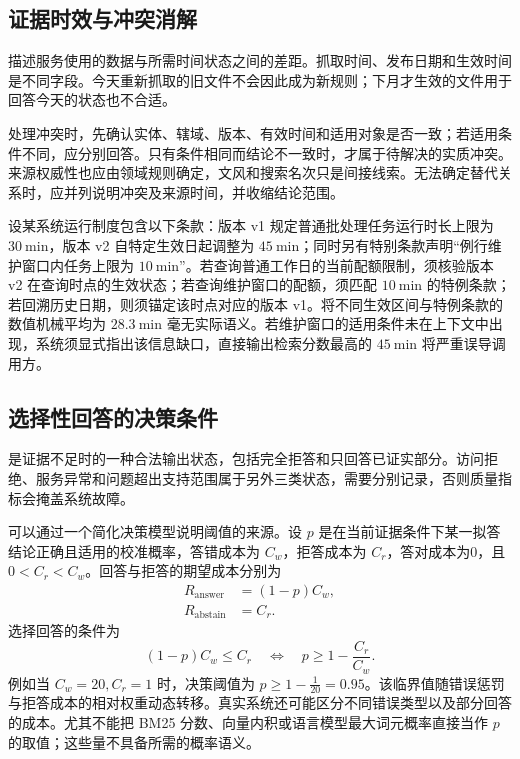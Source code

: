 \documentclass[../textbook.tex]{subfiles}
\begin{document}
\subsection{证据时效与冲突消解}
描述服务使用的数据与所需时间状态之间的差距。抓取时间、发布日期和生效时间是不同字段。今天重新抓取的旧文件不会因此成为新规则；下月才生效的文件用于回答今天的状态也不合适。

处理冲突时，先确认实体、辖域、版本、有效时间和适用对象是否一致；若适用条件不同，应分别回答。只有条件相同而结论不一致时，才属于待解决的实质冲突。来源权威性也应由领域规则确定，文风和搜索名次只是间接线索。无法确定替代关系时，应并列说明冲突及来源时间，并收缩结论范围。

设某系统运行制度包含以下条款：版本 v1 规定普通批处理任务运行时长上限为 $\qty{30}{\minute}$，版本 v2 自特定生效日起调整为 $\qty{45}{\minute}$；同时另有特别条款声明“例行维护窗口内任务上限为 $\qty{10}{\minute}$”。若查询普通工作日的当前配额限制，须核验版本 v2 在查询时点的生效状态；若查询维护窗口的配额，须匹配 $\qty{10}{\minute}$ 的特例条款；若回溯历史日期，则须锚定该时点对应的版本 v1。将不同生效区间与特例条款的数值机械平均为 $\qty{28.3}{\minute}$ 毫无实际语义。若维护窗口的适用条件未在上下文中出现，系统须显式指出该信息缺口，直接输出检索分数最高的 $\qty{45}{\minute}$ 将严重误导调用方。

\subsection{选择性回答的决策条件}
是证据不足时的一种合法输出状态，包括完全拒答和只回答已证实部分。访问拒绝、服务异常和问题超出支持范围属于另外三类状态，需要分别记录，否则质量指标会掩盖系统故障。

可以通过一个简化决策模型说明阈值的来源。设 $p$ 是在当前证据条件下某一拟答结论正确且适用的校准概率，答错成本为 $C_w$，拒答成本为 $C_r$，答对成本为0，且 $0<C_r<C_w$。回答与拒答的期望成本分别为
\begin{equation}
 \begin{aligned}
  R_{\mathrm{answer}} &= (1-p)C_w, \\
  R_{\mathrm{abstain}} &= C_r.
 \end{aligned}
\end{equation}
选择回答的条件为
\begin{equation}
 (1-p)C_w\le C_r
 \quad\Longleftrightarrow\quad
 p\ge1-\frac{C_r}{C_w}.
\end{equation}
例如当 $C_w=20, C_r=1$ 时，决策阈值为 $p \ge 1 - \frac{1}{20} = 0.95$。该临界值随错误惩罚与拒答成本的相对权重动态转移。真实系统还可能区分不同错误类型以及部分回答的成本。尤其不能把 BM25 分数、向量内积或语言模型最大词元概率直接当作 $p$ 的取值；这些量不具备所需的概率语义。
\end{document}
